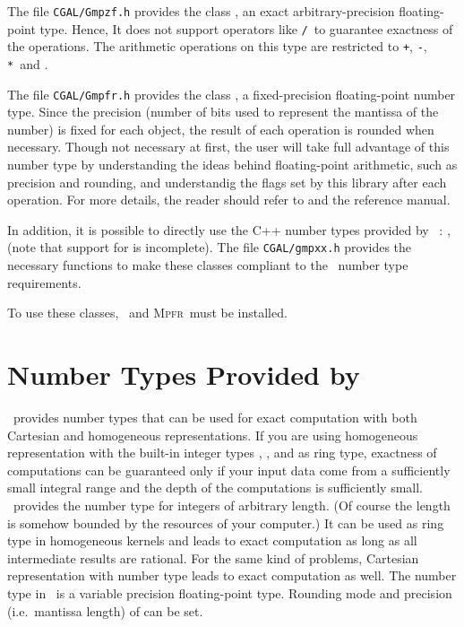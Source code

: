 The file {\tt CGAL/Gmpzf.h} provides the class , an exact
arbitrary-precision floating-point type. Hence, It does not support
operators like \verb=/=\ to guarantee exactness of the operations. The
arithmetic operations on this type are restricted to \verb=+=, \verb=-=,
\verb=*=\ and .

The file {\tt CGAL/Gmpfr.h} provides the class ,
a fixed-precision floating-point number type. Since the precision
(number of bits used to represent the mantissa of the number) is fixed
for each object, the result of each operation is rounded when necessary.
Though not necessary at first, the user will take full advantage of this
number type by understanding the ideas behind floating-point arithmetic,
such as precision and rounding, and understandig the flags set by this
library after each operation.  For more details, the reader should refer
to \cite{cgal:mt-mpfr} and the  reference manual.

In addition, it is possible to directly use the C++ number types provided by
\gmp~: ,  (note that support for
 is incomplete).  The file {\tt CGAL/gmpxx.h} provides the
necessary functions to make these classes compliant to the \cgal\ number type
requirements.

To use these classes, \gmp\ and \textsc{Mpfr}\ must be installed.


\section[Number Types Provided by LEDA] {Number Types Provided by \leda}
\label{leda-nt}

\leda\ provides number types that can be used for exact computation 
with both Cartesian and homogeneous representations.  If you are using
homogeneous representation with the built-in integer types
, , and  as ring type, exactness of
computations can be guaranteed only if your input data come from a
sufficiently small integral range and the depth of the computations is
sufficiently small.  \leda\ provides the number type  for
integers of arbitrary length. (Of course the length is
somehow bounded by the resources of your computer.)  It can be used as
ring type in homogeneous kernels and leads to exact
computation as long as all intermediate results are rational.  For the
same kind of problems, Cartesian representation with number type
 leads to exact computation as well.
The number type  in \leda\ is a variable precision
floating-point type. Rounding mode and precision (i.e.\ mantissa length) of
 can be set. 

